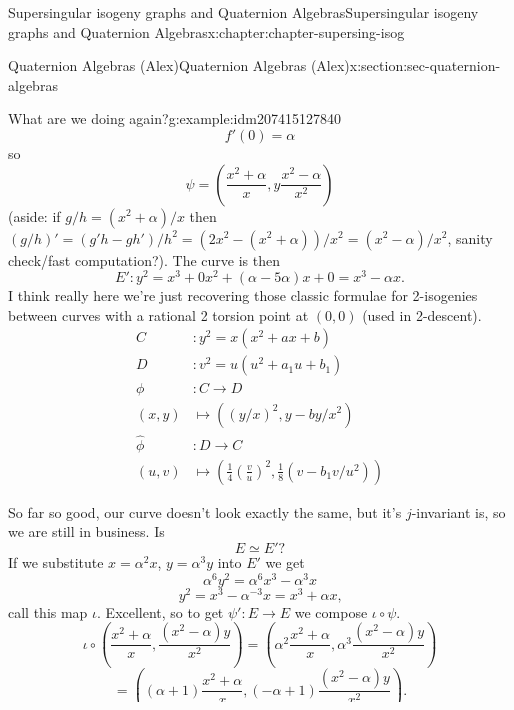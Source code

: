 \documentclass[oneside,10pt,]{book}
\numberwithin{equation}{section}
\newcommand{\amp}{&}
\begin{document}
\begin{chapterptx}{Supersingular isogeny graphs and Quaternion Algebras}{}{Supersingular isogeny graphs and Quaternion Algebras}{}{}{x:chapter:chapter-supersing-isog}
\begin{sectionptx}{Quaternion Algebras (Alex)}{}{Quaternion Algebras (Alex)}{}{}{x:section:sec-quaternion-algebras}
\begin{introduction}{}
\begin{example}{What are we doing again?}{g:example:idm207415127840}
\begin{equation*}
f'(0) = \alpha
\end{equation*}
so%
\begin{equation*}
\psi= \left(\frac{x^2 + \alpha}{x}, y\frac{x^2 - \alpha}{x^2} \right)
\end{equation*}
(aside: if \(g/h = (x^2+\alpha)/x\) then \((g/h)' = (g' h - g h')/h^2 = (2x^2 - (x^2 + \alpha))/x^2 = (x^2 - \alpha)/x^2\), sanity check\slash{}fast computation?). The curve is then%
\begin{equation*}
E'\colon y^2 = x^3 + 0x^2 + (\alpha - 5\alpha)x +0 = x^3  - \alpha x\text{.}
\end{equation*}
I think really here we're just recovering those classic formulae for 2-isogenies between curves with a rational 2 torsion point at \((0,0)\) (used in 2-descent).%
\begin{align*}
C\amp\colon y^2 = x(x^2+ax+b)\\
D\amp\colon v^2 = u(u^2+a_1u+b_1)\\
\phi\amp\colon C\to D\\
(x,y) \amp\mapsto ((y/x)^2 , y-by/x^2)\\
\hat\phi\amp\colon D\to C\\
(u,v) \amp\mapsto \left(\frac14\left(\frac vu\right)^2 ,\frac18( v-b_1 v/u^2)\right)
\end{align*}
%
\par
So far so good, our curve doesn't look exactly the same, but it's \(j\)-invariant is, so we are still in business. Is%
\begin{equation*}
E \simeq E'\text{?}
\end{equation*}
If we substitute \(x= \alpha^2 x\), \(y = \alpha ^3 y\) into \(E'\) we get%
\begin{equation*}
\alpha^6 y^2 = \alpha^6 x^3 - \alpha^3 x
\end{equation*}
%
\begin{equation*}
y^2 = x^3 - \alpha^{-3} x = x^3 +\alpha x\text{,}
\end{equation*}
call this map \(\iota\). Excellent, so to get \(\psi' \colon E\to E\) we compose \(\iota\circ \psi\).%
\begin{equation*}
\iota \circ\left( \frac{x^2  + \alpha}{x}, \frac{(x^2 - \alpha )y}{x^2}\right)  = \left( \alpha^2\frac{x^2  + \alpha}{x}, \alpha^3\frac{(x^2 - \alpha )y}{x^2}\right)
\end{equation*}
%
\begin{equation*}
= \left( (\alpha+  1)\frac{x^2  + \alpha}{x}, ( -\alpha  + 1)\frac{(x^2 - \alpha )y}{x^2}\right)\text{.}
\end{equation*}

\end{example}
\end{introduction}
\end{sectionptx}
\end{chapterptx}
\end{document}
